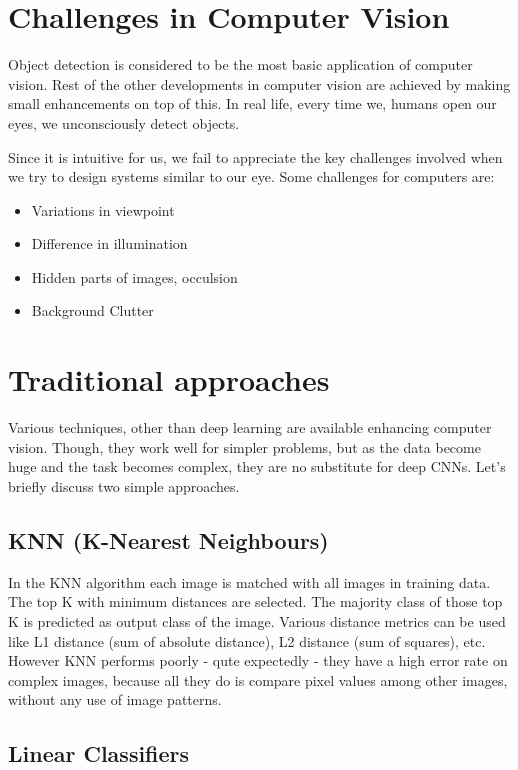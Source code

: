 \section{Challenges in Computer Vision}
Object detection is considered to be the most basic application of computer
vision. Rest of the other developments in computer vision are achieved by making
small enhancements on top of this. In real life, every time we, humans open our
eyes, we unconsciously detect objects.

Since it is intuitive for us, we fail to appreciate the key challenges involved
when we try to design systems similar to our eye. Some challenges for computers are:

\begin{itemize}
    \item Variations in viewpoint
    \item Difference in illumination
    \item Hidden parts of images, occulsion
    \item Background Clutter
\end{itemize}

\section{Traditional approaches}

Various techniques, other than deep learning are available enhancing computer
vision. Though, they work well for simpler problems, but as the data become huge
and the task becomes complex, they are no substitute for deep CNNs. Let’s
briefly discuss two simple approaches.

\subsection{KNN (K-Nearest Neighbours)}

In the KNN algorithm each image is matched with all images in training data. The
top K with minimum distances are selected. The majority class of those top K is
predicted as output class of the image. Various distance metrics can be used
like L1 distance (sum of absolute distance), L2 distance (sum of squares), etc.
However KNN performs poorly - qute expectedly - they have a high error rate on
complex images, because all they do is compare pixel values among other images,
without any use of image patterns.

\subsection{Linear Classifiers}

